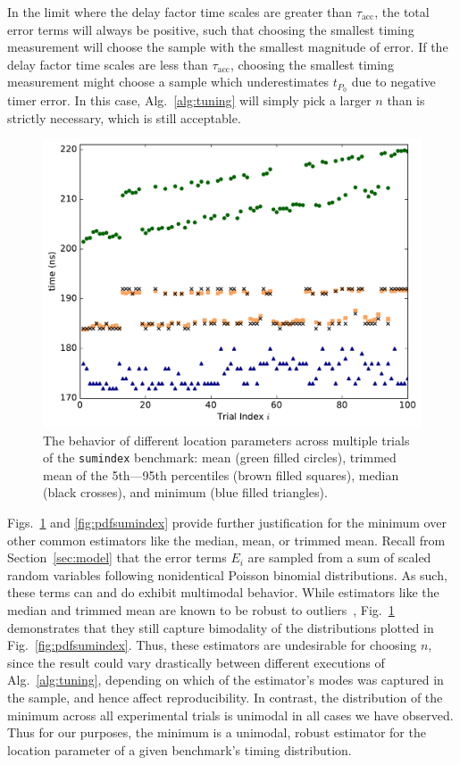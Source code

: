 \documentclass[conference]{IEEEtran}
\begin{document}
In the limit where the delay factor time scales are greater than $\tau_{\textrm{acc}}$, the
total error terms will always be positive, such that choosing the smallest timing
measurement will choose the sample with the smallest magnitude of error. If the delay factor
time scales are less than $\tau_{\textrm{acc}}$, choosing the smallest timing measurement
might choose a sample which underestimates $t_{P_0}$ due to negative timer error. In this
case, Alg.~\ref{alg:tuning} will simply pick a larger $n$ than is strictly necessary, which
is still acceptable.

\begin{figure}
\centering
\includegraphics[width=\columnwidth]{figures/fig3/location_estimators_sumindex}
\caption{The behavior of different location parameters across multiple trials of
the \lstinline|sumindex| benchmark: mean (green filled circles), trimmed mean of
the 5th---95th percentiles (brown filled squares), median (black crosses), and
minimum (blue filled triangles).}
\label{fig:locationmeasures}
\end{figure}

Figs.~\ref{fig:locationmeasures} and \ref{fig:pdfsumindex} provide further
justification for the minimum over other common estimators like the median,
mean, or trimmed mean. Recall from Section~\ref{sec:model} that the error terms
$E_i$ are sampled from a sum of scaled random variables following nonidentical
Poisson binomial distributions. As such, these terms can and do exhibit
multimodal behavior. While estimators like the median and trimmed mean are
known to be robust to outliers~\cite{Maronna2006},
Fig.~\ref{fig:locationmeasures} demonstrates that they still capture bimodality
of the distributions plotted in Fig.~\ref{fig:pdfsumindex}. Thus, these
estimators are undesirable for choosing $n$, since the result could vary
drastically between different executions of Alg.~\ref{alg:tuning}, depending on
which of the estimator's modes was captured in the sample, and hence affect
reproducibility. In contrast, the distribution of the minimum across all
experimental trials is unimodal in all cases we have observed. Thus for our
purposes, the minimum is a unimodal, robust estimator for the location
parameter of a given benchmark's timing distribution.
\end{document}

